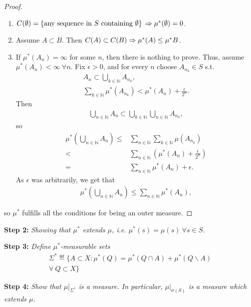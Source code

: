     \begin{proof} \ \\
        \begin{enumerate}
            \item \(C(\emptyset) = \left\{ \text{any sequence in }S\text{ containing }\emptyset  \right\} \\
            \Rightarrow \mu^{*}(\emptyset) = 0\).
            \item Assume \(A\subset B\). Then \(C(A) \subset C(B) \\ \Rightarrow \mu^{*}(A) \leq \mu^{*}{B}\).
            \item If \(\mu^{*}(A_n) = \infty\) for some \(n\), then there is nothing to prove. Thus, assume \\ \(\mu^{*}(A_n) < \infty \ \forall n\).
            Fix \(\epsilon > 0\), and for every \(n\) choose \(A_{n_k}\in S\) s.t.
            \begin{align*}
                A_n \subset \bigcup\limits_{k\in\mathbb{N}} A_{n_k}, \\ 
                \sum\limits_{k\in\mathbb{N}}\mu^{*}(A_{n_k}) < \mu^{*}(A_n) + \frac{\epsilon}{2^n}.
            \end{align*}
            Then
            \begin{align*}
                \bigcup\limits_{n\in\mathbb{N}} A_n \subset \bigcup\limits_{k\in\mathbb{N}}\bigcup\limits_{n\in\mathbb{N}} A_{n_k},
            \end{align*}
            so 
            \begin{align*}
                \mu^{*}\left( \bigcup\limits_{n\in\mathbb{N}} A_n\right) \leq& \sum\limits_{n\in\mathbb{N}}\sum\limits_{k\in\mathbb{N}}\mu\left(A_{n_k}\right) \\
                <& \sum\limits_{n\in\mathbb{N}}\left( \mu^{*}(A_n) + \frac{\epsilon}{2^n}\right) \\ 
                =& \sum\limits_{n\in\mathbb{N}}\mu^{*}(A_n) + \epsilon.
            \end{align*}
            As \(\epsilon\) was arbitrarily, we get that
            \begin{align*}
                \mu^{*}\left( \bigcup\limits_{n\in\mathbb{N}} A_n\right) \leq \sum\limits_{n\in\mathbb{N}}\mu^{*}(A_n),
            \end{align*}
        \end{enumerate}
        so \(\mu^{*}\) fulfills all the conditions for being an outer measure.
    \end{proof}
    \textbf{Step 2:} \emph{Showing that \(\mu^{*}\) extends \(\mu\), i.e. \(\mu^{*}(s) = \mu(s) \ \forall s\in S\).}
    
    \textbf{Step 3:} \emph{Define \(\mu^{*}\)-measurable sets}
    \begin{align*}
        \Sigma^{*} \eqdef \Biggl\{ A \subset X: \mu^{*}(Q) = \mu^{*}(Q\cap A) + \mu^{*}(Q \backslash A) \\ \forall \ Q \subset X \Biggr\}
    \end{align*}

    \textbf{Step 4:} \emph{Show that \(\mu\vert_{\Sigma^{*}}\) is a measure. In particular, \(\mu\vert_{\sigma(S)}\) is a measure which extends \(\mu\).}